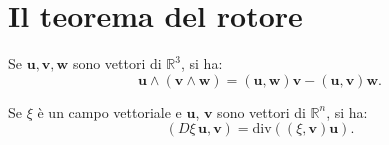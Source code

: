 \documentclass[italian,a4paper]{scrartcl}
\newcommand{\RR}{{\mathbb R}}
\renewcommand{\vec}{\mathbf}
\renewcommand{\div}{\mathrm{div}}
\begin{document}
 %

\section{Il teorema del rotore}
\begin{lemma}
\label{lm:triple_external_product}
Se $\vec u,\vec v, \vec w$ sono vettori di $\RR^3$, si ha:
\[
\vec u\wedge (\vec v \wedge \vec w)  = (\vec u,\vec w) \vec v - (\vec
u,\vec v) \vec w.
\]
\end{lemma}

\begin{lemma}
\label{lm:div_jacobian}
Se $\xi$ è un campo vettoriale e $\vec u$, $\vec v$ sono vettori di
$\RR^n$, si ha:
\[
(D\xi\, \vec u,\vec v) = \div ((\xi,\vec v)\vec u).
\]
\end{lemma}
\end{document}
